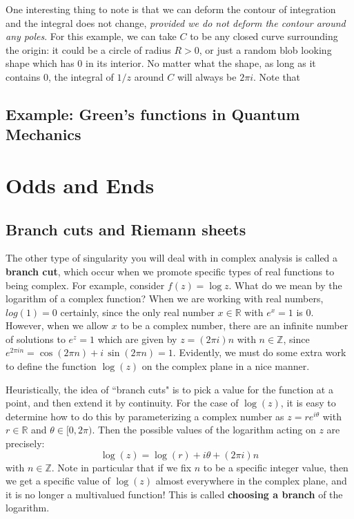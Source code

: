 \documentclass[11pt, oneside]{article}   	%
\theoremstyle{definition}
\begin{document}
One interesting thing to note is that we can deform the contour of integration and the integral does not change, \textit{provided 
we do not deform the contour around any poles}. For this example, we can take $C$ to be any closed curve surrounding 
the origin: it could be a circle of radius $R > 0$, or just a random blob looking shape which has 0 in its interior. No matter 
what the shape, as long as it contains 0, the integral of $1 / z$ around $C$ will always be $2\pi i$. Note that 


\subsection{Example: Green's functions in Quantum Mechanics}

\section{Odds and Ends}

\subsection{Branch cuts and Riemann sheets}

The other type of singularity you will deal with in complex analysis is called a \textbf{branch cut}, which occur when we 
promote specific types of real functions to being complex. For example, consider $f(z) = \log z$. What do we mean by the 
logarithm of a complex function? When we are working with real numbers, $log(1) = 0$ certainly, since the only real number 
$x\in\mathbb R$ with $e^x = 1$ is $0$. However, when we allow $x$ to be a complex number, there are an infinite number 
of solutions to $e^z = 1$ which are given by $z = (2\pi i) n$ with $n\in\mathbb Z$, since $e^{2\pi in} = \cos(2\pi n) + i\,\sin(2\pi 
n) = 1$. Evidently, we must do some extra work to define the function $\log(z)$ on the complex plane in a nice manner. 

Heuristically, the idea of ``branch cuts" is to pick a value for the function at a point, and then extend it by continuity. For the 
case of $\log(z)$, it is easy to determine how to do this by parameterizing a complex number as $z = re^{i\theta}$ with 
$r\in\mathbb R$ and $\theta\in [0, 2\pi)$. Then the possible values of the logarithm acting on $z$ are precisely:
\begin{equation}
	\log(z) = \log(r) + i\theta + (2\pi i)n
\end{equation}
with $n\in\mathbb Z$. Note in particular that if we fix $n$ to be a specific integer value, then we get a specific value of $\log(z)$ 
almost everywhere in the complex plane, and it is no longer a multivalued function! This is called \textbf{choosing a branch} of 
the logarithm. 
\end{document}
